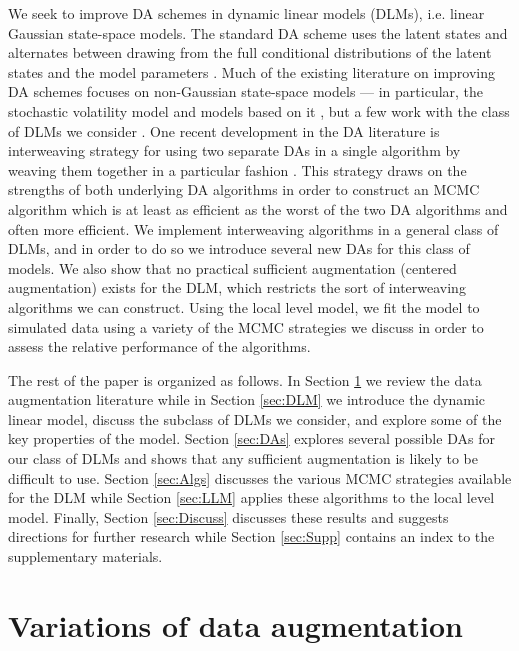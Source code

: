 \documentclass[12pt]{article}
\begin{document}
We seek to improve DA schemes in dynamic linear models (DLMs), i.e. linear Gaussian state-space models. The standard DA scheme uses the latent states and alternates between drawing from the full conditional distributions of the latent states and the model parameters \citep{fruhwirth1994data,carter1994gibbs}. Much of the existing literature on improving DA schemes focuses on non-Gaussian state-space models --- in particular, the stochastic volatility model and models based on it \citep{shephard1996statistical,fruhwirth2003bayesian,roberts2004bayesian,bos2006inference,strickland2008parameterisation,fruhwirth2008heston,kastner2013ancillarity}, but a few work with the class of DLMs we consider \citep{fruhwirth2004efficient}. One recent development in the DA literature is interweaving strategy for using two separate DAs in a single algorithm by weaving them together in a particular fashion \citep{yu2011center}. This strategy draws on the strengths of both underlying DA algorithms in order to construct an MCMC algorithm which is at least as efficient as the worst of the two DA algorithms and often more efficient. We implement interweaving algorithms in a general class of DLMs, and in order to do so we introduce several new DAs for this class of models. We also show that no practical sufficient augmentation (centered augmentation) exists for the DLM, which restricts the sort of interweaving algorithms we can construct. Using the local level model, we fit the model to simulated data using a variety of the MCMC strategies we discuss in order to assess the relative performance of the algorithms.

The rest of the paper is organized as follows. In Section \ref{sec:DA} we review the data augmentation literature while in Section \ref{sec:DLM} we introduce the dynamic linear model, discuss the subclass of DLMs we consider, and explore some of the key properties of the model. Section \ref{sec:DAs} explores several possible DAs for our class of DLMs and shows that any sufficient augmentation is likely to be difficult to use. Section \ref{sec:Algs} discusses the various MCMC strategies available for the DLM while Section \ref{sec:LLM} applies these algorithms to the local level model. Finally, Section \ref{sec:Discuss} discusses these results and suggests directions for further research while Section \ref{sec:Supp} contains an index to the supplementary materials.

\section{Variations of data augmentation}\label{sec:DA}
\end{document}
